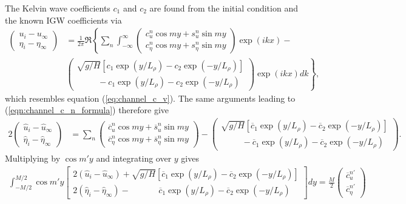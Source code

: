 \documentclass[10pt,reqno]{amsart}
\begin{document}
The Kelvin wave coefficients $c_1$ and $c_2$ are found from the initial condition and the known IGW coefficients via
\begin{align}
\begin{pmatrix}
u_i - u_\infty \\
\eta_i - \eta_\infty
\end{pmatrix} & = 
\frac{1}{2 \pi} \Re \left\{
\sum_n 
\int_{-\infty}^{\infty} 
\begin{pmatrix}
c_u^n \cos m y  + s_u^n \sin m y \\
c_\eta^n  \cos m y  + s_\eta^n \sin m y
\end{pmatrix} 
\exp \left(i k x \right)
\right.  - \nonumber \\
& \left.
\begin{pmatrix} 
\sqrt{g/H} \left[ c_1 \exp \left( y/L_\rho \right) - c_2 \exp \left( - y/L_\rho \right) \right]\\
\;\;\;\;\; \;\; \;\;- c_1 \exp  \left( y/L_\rho \right) - c_2 \exp \left( - y/L_\rho \right)
\end{pmatrix} 
\exp \left(i k x \right)  dk 
\right\} ,
\label{eq:channel_u_eta_soln}
\end{align}
which resembles equation (\ref{eq:channel_c_v}).
The same arguments leading to (\ref{eqn:channel_c_n_formula}) therefore give
\begin{align}
2 \begin{pmatrix}
\hat{u}_i - \hat{u}_\infty \\
\hat{\eta}_i - \hat{\eta}_\infty
\end{pmatrix} & = 
\sum_n
\begin{pmatrix}
\overline{c}_u^n \cos m y  + \overline{s}_u^n \sin m y \\
\overline{c}_\eta^n  \cos m y  + \overline{s}_\eta^n \sin m y
\end{pmatrix}  -
\begin{pmatrix} 
\sqrt{g/H} \left[ \overline{c}_1 \exp \left( y/L_\rho \right) - \overline{c}_2 \exp \left( - y/L_\rho \right) \right]\\
\;\;\;\;\; \;\; \;\;- \overline{c}_1 \exp  \left( y/L_\rho \right) - \overline{c}_2 \exp \left( - y/L_\rho \right)
\end{pmatrix} .
\label{eqn:Kwave_intermediate}
\end{align}
Multiplying by $\cos m' y $ and integrating over $y$ gives
\begin{align}
\int_{-M/2}^{M/2}  \cos m' y
\begin{bmatrix} 
2 \left( \hat{u}_i - \hat{u}_\infty \right) +\sqrt{g/H} \left[ \overline{c}_1 \exp \left( y/L_\rho \right) - \overline{c}_2 \exp \left( - y/L_\rho \right) \right]\\
2 \left( \hat{\eta}_i - \hat{\eta}_\infty \right) - \;\;\;\;\; \;\; \;\;\;\;\; \overline{c}_1 \exp  \left( y/L_\rho \right) - \overline{c}_2 \exp \left( - y/L_\rho \right)
\end{bmatrix} dy = 
\frac{M}{2}
\begin{pmatrix}
\overline{c}_u^{n'}   \\
\overline{c}_\eta^{n'}  
\end{pmatrix}
\end{align}
\end{document}
